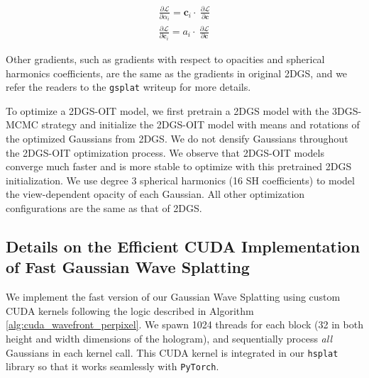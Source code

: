 \begin{align}
    \frac{\partial \mathcal{L}}{\partial \alpha_i} = \mathbf{c}_i \cdot \ \frac{\partial \mathcal{L}}{\partial \mathbf{c}} \\
    \frac{\partial \mathcal{L}}{\partial \mathbf{c}_i} = a_i \cdot \ \frac{\partial \mathcal{L}}{\partial \mathbf{c}}
\end{align}

Other gradients, such as gradients with respect to opacities and spherical harmonics coefficients, are the same as the gradients in original 2DGS, and we refer the readers to the \texttt{gsplat} writeup \cite{ye2024gsplat} for more details.

To optimize a 2DGS-OIT model, we first pretrain a 2DGS model with the 3DGS-MCMC strategy and initialize the 2DGS-OIT model with means and rotations of the optimized Gaussians from 2DGS. We do not densify Gaussians throughout the 2DGS-OIT optimization process. We observe that 2DGS-OIT models converge much faster and is more stable to optimize with this pretrained 2DGS initialization. We use degree 3 spherical harmonics (16 SH coefficients) to model the view-dependent opacity of each Gaussian. All other optimization configurations are the same as that of 2DGS.



\subsection{Details on the Efficient CUDA Implementation of Fast Gaussian Wave Splatting}
\label{subsec:details}
We implement the fast version of our Gaussian Wave Splatting using custom CUDA kernels following the logic described in Algorithm \ref{alg:cuda_wavefront_perpixel}. We spawn 1024 threads for each block (32 in both height and width dimensions of the hologram), and sequentially process \textit{all} Gaussians in each kernel call. This CUDA kernel is integrated in our \texttt{hsplat} library so that it works seamlessly with \texttt{PyTorch}.


\newpage
